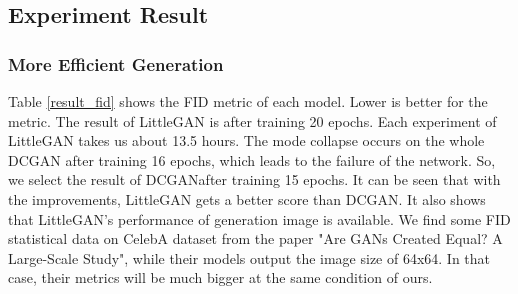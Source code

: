 \subsection{Experiment Result}
\subsubsection*{More Efficient Generation}
Table \ref{result_fid} shows the FID metric of each model.
Lower is better for the metric.
The result of LittleGAN is after training 20 epochs.
Each experiment of LittleGAN takes us about 13.5 hours.
The mode collapse occurs on the whole DCGAN after training 16 epochs,
    which leads to the failure of the network.
    So, we select the result of DCGANafter training 15 epochs.
It can be seen that with the improvements,
    LittleGAN gets a better score than DCGAN.
    It also shows that LittleGAN's performance of generation image is available.
We find some FID statistical data on CelebA dataset from the paper "Are GANs Created Equal? A Large-Scale Study",
    while their models output the image size of 64x64.
In that case, their metrics will be much bigger at the same condition of ours.


